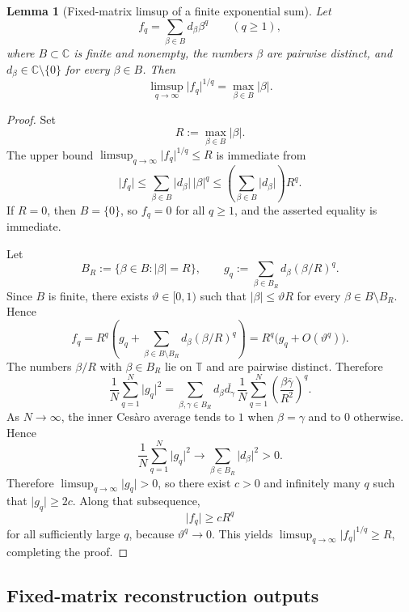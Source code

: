 \documentclass[11pt,a4paper]{amsart}
\theoremstyle{plain}
\newtheorem{lemma}[theorem]{Lemma}
\theoremstyle{definition}
\theoremstyle{remark}
\newcommand{\CC}{\mathbb{C}}
\newcommand{\TT}{\mathbb{T}}
\newcommand{\abs}[1]{\lvert #1 \rvert}
\begin{document}
\begin{lemma}[Fixed-matrix limsup of a finite exponential sum]
  \label{lem:finite-part-exponential-sum-limsup}
  Let
  \[
    f_q=\sum_{\beta\in B} d_\beta \beta^q
    \qquad (q\ge 1),
  \]
  where \(B\subset\CC\) is finite and nonempty, the numbers \(\beta\) are
  pairwise distinct, and \(d_\beta\in\CC\setminus\{0\}\) for every
  \(\beta\in B\).
  Then
  \[
    \limsup_{q\to\infty}\abs{f_q}^{1/q}
    =\max_{\beta\in B}\abs{\beta}.
  \]
\end{lemma}

\begin{proof}
  Set
  \[
    R:=\max_{\beta\in B}\abs{\beta}.
  \]
  The upper bound
  \(\limsup_{q\to\infty}\abs{f_q}^{1/q}\le R\) is immediate from
  \[
    \abs{f_q}
    \le \sum_{\beta\in B}\abs{d_\beta}\,\abs{\beta}^q
    \le \left(\sum_{\beta\in B}\abs{d_\beta}\right)R^q.
  \]
  If \(R=0\), then \(B=\{0\}\), so \(f_q=0\) for all \(q\ge 1\), and the
  asserted equality is immediate.

  Let
  \[
    B_R:=\{\beta\in B:\abs{\beta}=R\},
    \qquad
    g_q:=\sum_{\beta\in B_R} d_\beta (\beta/R)^q.
  \]
  Since \(B\) is finite, there exists \(\vartheta\in[0,1)\) such that
  \(\abs{\beta}\le \vartheta R\) for every \(\beta\in B\setminus B_R\).
  Hence
  \[
    f_q
    =
    R^q\left(g_q+\sum_{\beta\in B\setminus B_R}d_\beta(\beta/R)^q\right)
    =
    R^q\bigl(g_q+O(\vartheta^q)\bigr).
  \]
  The numbers \(\beta/R\) with \(\beta\in B_R\) lie on \(\TT\) and are
  pairwise distinct. Therefore
  \[
    \frac{1}{N}\sum_{q=1}^N\abs{g_q}^2
    =
    \sum_{\beta,\gamma\in B_R}
      d_\beta\overline{d_\gamma}\,
      \frac{1}{N}\sum_{q=1}^N
        \left(\frac{\beta\overline{\gamma}}{R^2}\right)^q.
  \]
  As \(N\to\infty\), the inner Ces\`aro average tends to \(1\) when
  \(\beta=\gamma\) and to \(0\) otherwise. Hence
  \[
    \frac{1}{N}\sum_{q=1}^N\abs{g_q}^2
    \longrightarrow
    \sum_{\beta\in B_R}\abs{d_\beta}^2>0.
  \]
  Therefore \(\limsup_{q\to\infty}\abs{g_q}>0\), so there exist
  \(c>0\) and infinitely many \(q\) such that \(\abs{g_q}\ge 2c\). Along
  that subsequence,
  \[
    \abs{f_q}\ge cR^q
  \]
  for all sufficiently large \(q\), because \(\vartheta^q\to 0\). This
  yields
  \(\limsup_{q\to\infty}\abs{f_q}^{1/q}\ge R\), completing the proof.
\end{proof}

\subsection{Fixed-matrix reconstruction outputs}
\end{document}
